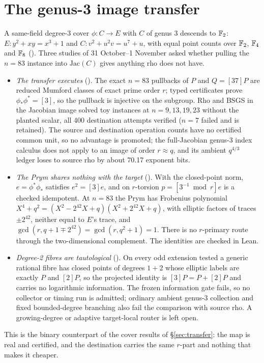 \section{The genus-3 image transfer}\label{sec:n83l-genus3}

A same-field degree-3 cover $\phi: C\to E$ with $C$ of genus 3 descends to
$\mathbb{F}_2$: $E: y^2+xy=x^3+1$ and $C: v^2+u^2v=u^7+u$, with equal point counts
over $\mathbb{F}_2$, $\mathbb{F}_4$ and $\mathbb{F}_8$
(). Three studies
of 31 October--1 November asked whether pulling the $n=83$ instance into
$\mathrm{Jac}(C)$ gives anything rho does not have.
\begin{itemize}
\item \emph{The transfer executes}
  (). The exact
  $n=83$ pullbacks of $P$ and $Q=[37]P$ are reduced Mumford classes of exact
  prime order $r$; typed certificates prove $\phi_*\phi^*=[3]$, so the
  pullback is injective on the subgroup. Rho and BSGS in the Jacobian image
  solved toy instances at $n=9,13,19,23$ without the planted scalar, all
  400 destination attempts verified ($n=7$ failed and is retained). The
  source and destination operation counts have no certified common unit, so
  no advantage is promoted; the full-Jacobian genus-3 index calculus does
  not apply to an image of order $r\approx q$, and its ambient $q^{4/3}$
  ledger loses to source rho by about 70.17 exponent bits.
\item \emph{The Prym shares nothing with the target}
  (). With the
  closed-point norm, $e=\phi^*\phi_*$ satisfies $e^2=[3]e$, and on
  $r$-torsion $p=[3^{-1}\bmod r]e$ is a checked idempotent. At $n=83$ the
  Prym has Frobenius polynomial
  $X^4+q^2=(X^2-2^{42}X+q)(X^2+2^{42}X+q)$, with elliptic factors of traces
  $\pm2^{42}$, neither equal to $E$'s trace, and
  $\gcd(r,q+1\mp2^{42})=\gcd(r,q^2+1)=1$. There is no $r$-primary route
  through the two-dimensional complement. The identities are checked in
  Lean.
\item \emph{Degree-2 fibres are tautological}
  (). On every odd
  extension tested a generic rational fibre has closed points of degrees
  $1+2$ whose elliptic labels are exactly $P$ and $[2]P$, so the projected
  identity is $[3]P=P+[2]P$ and carries no logarithmic information. The
  frozen information gate fails, so no collector or timing run is admitted;
  ordinary ambient genus-3 collection and fixed bounded-degree branching
  also fail the comparison with source rho. A growing-degree or adaptive
  target-local router is left open.
\end{itemize}
This is the binary counterpart of the cover results of
\S\ref{sec:transfer}: the map is real and certified, and the destination
carries the same $r$-part and nothing that makes it cheaper.


